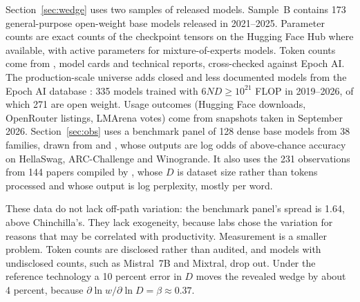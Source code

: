 Section~\ref{sec:wedge} uses two samples of released models. Sample~B contains 173 general-purpose open-weight base
models released in 2021--2025. Parameter counts are exact counts of the checkpoint tensors on the Hugging Face Hub where
available, with active parameters for mixture-of-experts models. Token counts come from \citet{ruan2024observational},
model cards and technical reports, cross-checked against Epoch AI. The production-scale universe adds closed and less
documented models from the Epoch AI database \citep{epochai2026data}: 335 models trained with $6ND\ge10^{21}$ FLOP in
2019--2026, of which 271 are open weight. Usage outcomes (Hugging Face downloads, OpenRouter listings, LMArena votes)
come from snapshots taken in September 2026. Section~\ref{sec:obs} uses a benchmark panel of 128 dense base models from
38 families, drawn from \citet{ruan2024observational} and \citet{maiapolo2024sloth}, whose outputs are log odds of
above-chance accuracy on HellaSwag, ARC-Challenge and Winogrande. It also uses the 231 observations from 144 papers
compiled by \citet{ho2024algorithmic}, whose $D$ is dataset size rather than tokens processed and whose output is log
perplexity, mostly per word.

These data do not lack off-path variation: the benchmark panel's spread is 1.64, above Chinchilla's. They lack
exogeneity, because labs chose the variation for reasons that may be correlated with productivity. Measurement is a
smaller problem. Token counts are disclosed rather than audited, and models with undisclosed counts, such as Mistral~7B
and Mixtral, drop out. Under the reference technology a 10 percent error in $D$ moves the revealed wedge by about 4
percent, because $\partial\ln w/\partial\ln D=\beta\approx0.37$.
